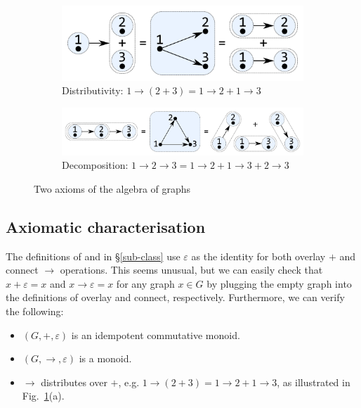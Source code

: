 \begin{figure}
\begin{subfigure}[b]{0.4\linewidth}
\centerline{\includegraphics[scale=0.27]{fig/ax-distributivity.pdf}}
\caption{Distributivity: $1 \rightarrow (2 + 3) = 1 \rightarrow 2 + 1 \rightarrow 3$ }
\end{subfigure}
\hspace{12mm}
\begin{subfigure}[b]{0.5\linewidth}
\centerline{\includegraphics[scale=0.27]{fig/ax-decomposition.pdf}}
\caption{Decomposition: $1 \rightarrow 2 \rightarrow 3 = 1 \rightarrow 2 +
1 \rightarrow 3 + 2 \rightarrow 3$}
\end{subfigure}
\vspace{-3mm}
\caption{Two axioms of the algebra of graphs\label{fig-axioms}}
\vspace{-4mm}
\end{figure}

\subsection{Axiomatic characterisation}\label{sub-laws}

The definitions of  and  in \S\ref{sub-class}
use $\varepsilon$ as the identity for both overlay $+$ and connect $\rightarrow$
operations. This seems unusual, but we can easily check that
$x + \varepsilon = x$ and $x \rightarrow \varepsilon = x$ for any graph $x \in G$
by plugging the empty graph into the definitions of overlay and connect,
respectively. Furthermore, we can verify the following:
\begin{itemize}
    \item $(G,+,\varepsilon)$ is an idempotent commutative monoid.
    \item $(G,\rightarrow,\varepsilon)$ is a monoid.
    \item $\rightarrow$ distributes over $+$, e.g.
    $1 \rightarrow (2 + 3) = 1 \rightarrow 2 + 1 \rightarrow 3$, as illustrated
    in Fig.~\ref{fig-axioms}(a).
\end{itemize}

